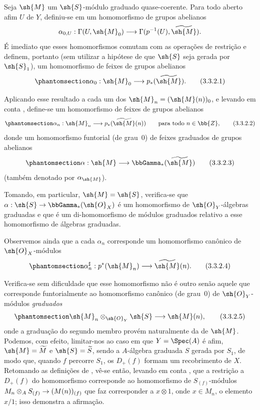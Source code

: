 \documentclass[oneside,10pt]{amsart}
\makeatletter
\newcommand{\ega@arrow}[2]{\mathchoice{#1}{#2}{#2}{#2}}
\renewcommand{\to}{\ega@arrow{\longrightarrow}{\rightarrow}}
\newcommand{\oldpage}[2][]{\marginnote{\normalfont\footnotesize\textbf{#1}~|~#2}\ignorespaces}
\let\EGAOriginalLabel\label
\renewcommand{\label}[1]{\phantomsection\EGAOriginalLabel{#1}}
\makeatother
\begin{document}
\begin{env}[3.3.2]
\label{II.3.3.2}
Seja $\sh{M}$ um $\sh{S}$-módulo graduado quase-coerente.
Para todo aberto afim $U$ de $Y$, definiu-se em  um homomorfismo de grupos abelianos
\[
  \alpha_{0,U}:\Gamma(U,\sh{M}_0)\to\Gamma(p^{-1}(U),\widetilde{\sh{M}}).
\]
É imediato que esses homomorfismos comutam com as operações de restrição  e definem, portanto (sem utilizar a hipótese de que $\sh{S}$ seja gerada por $\sh{S}_1$), um homomorfismo de feixes de grupos abelianos
\[
\label{II.3.3.2.1}
  \alpha_0:\sh{M}_0\to p_*(\widetilde{\sh{M}}).
\tag{3.3.2.1}
\]

Aplicando esse resultado a cada um dos $\sh{M}_n=(\sh{M}(n))_0$, e levando em conta , define-se um homomorfismo de feixes de grupos abelianos
\[
\label{II.3.3.2.2}
  \alpha_n:\sh{M}_n\to p_*(\widetilde{\sh{M}}(n))
  \qquad\text{para todo }n\in\bb{Z},
\tag{3.3.2.2}
\]
donde um homomorfismo funtorial (de grau~$0$) de feixes graduados de grupos abelianos
\[
\label{II.3.3.2.3}
  \alpha:\sh{M}\to\bbGamma_*(\widetilde{\sh{M}})
\tag{3.3.2.3}
\]
(também denotado por $\alpha_{\sh{M}}$).

Tomando, em particular, $\sh{M}=\sh{S}$, verifica-se que $\alpha:\sh{S}\to\bbGamma_*(\sh{O}_X)$ é um homomorfismo de $\sh{O}_Y$-álgebras graduadas e que  é um di-homomorfismo de módulos graduados relativo a esse homomorfismo de álgebras graduadas.

Observemos ainda que a cada $\alpha_n$ corresponde  um homomorfismo canônico de $\sh{O}_X$-módulos
\[
\label{II.3.3.2.4}
  \alpha_n^\sharp:p^*(\sh{M}_n)\to\widetilde{\sh{M}}(n).
\tag{3.3.2.4}
\]

Verifica-se sem dificuldade que esse homomorfismo não é outro senão aquele que corresponde funtorialmente  ao homomorfismo canônico (de grau~$0$) de $\sh{O}_Y$-módulos \emph{graduados}
\[
\label{II.3.3.2.5}
  \sh{M}_n\otimes_{\sh{O}_Y}\sh{S}\to\sh{M}(n),
\tag{3.3.2.5}
\]
\oldpage[II]{58}
onde a graduação do segundo membro provém naturalmente da de $\sh{M}$.
Podemos, com efeito, limitar-nos ao caso em que $Y=\Spec(A)$ é afim, $\sh{M}=\widetilde{M}$ e $\sh{S}=\widetilde{S}$, sendo a $A$-álgebra graduada $S$ gerada por $S_1$, de modo que, quando $f$ percorre $S_1$, os $D_+(f)$ formam um recobrimento de $X$.
Retomando as definições de , vê-se então, levando em conta , que a restrição a $D_+(f)$ do homomorfismo  corresponde  ao homomorfismo de $S_{(f)}$-módulos $M_n\otimes_A S_{(f)}\to(M(n))_{(f)}$ que faz corresponder a $x\otimes1$, onde $x\in M_n$, o elemento $x/1$;
isso demonstra a afirmação.
\end{env}
\end{document}
